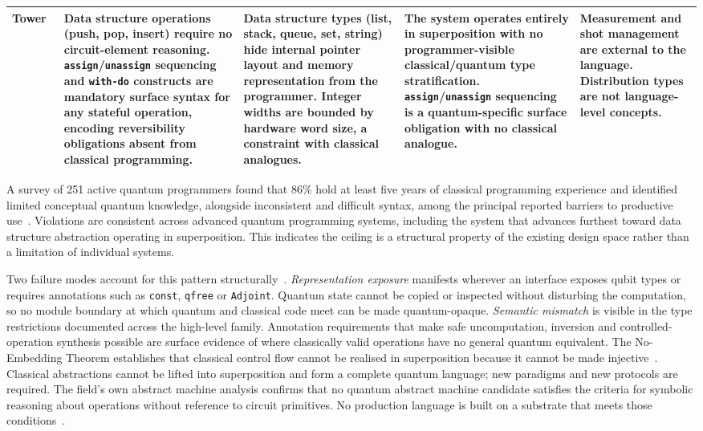 \begin{longtable}{p{1.8cm} p{3.3cm} p{3.3cm} p{3.3cm} p{3.3cm}}
    \textbf{Tower}~\cite{yuan2025foundationalabstractions}
    & Data structure operations (push, pop, insert) require no circuit-element reasoning. \texttt{assign}/\texttt{unassign} sequencing and \texttt{with-do} constructs are mandatory surface syntax for any stateful operation, encoding reversibility obligations absent from classical programming.
    & Data structure types (list, stack, queue, set, string) hide internal pointer layout and memory representation from the programmer. Integer widths are bounded by hardware word size, a constraint with classical analogues.
    & The system operates entirely in superposition with no programmer-visible classical/quantum type stratification. \texttt{assign}/\texttt{unassign} sequencing is a quantum-specific surface obligation with no classical analogue.
    & Measurement and shot management are external to the language. Distribution types are not language-level concepts. \\
    \bottomrule
\end{longtable}
\vspace{2em}

A survey of 251 active quantum programmers found that 86\% hold at least five years of classical programming experience and identified limited conceptual quantum knowledge, alongside inconsistent and difficult syntax, among the principal reported barriers to productive use~\cite{ferreira2024qplusage}.
Violations are consistent across advanced quantum programming systems, including the system that advances furthest toward data structure abstraction operating in superposition.
This indicates the ceiling is a structural property of the existing design space rather than a limitation of individual systems.

Two failure modes account for this pattern structurally~\cite{yuan2025foundationalabstractions}.
\textit{Representation exposure} manifests wherever an interface exposes qubit types or requires annotations such as \texttt{const}, \texttt{qfree} or \texttt{Adjoint}.
Quantum state cannot be copied or inspected without disturbing the computation, so no module boundary at which quantum and classical code meet can be made quantum-opaque.
\textit{Semantic mismatch} is visible in the type restrictions documented across the high-level family.
Annotation requirements that make safe uncomputation, inversion and controlled-operation synthesis possible are surface evidence of where classically valid operations have no general quantum equivalent.
The No-Embedding Theorem establishes that classical control flow cannot be realised in superposition because it cannot be made injective~\cite{yuan2025foundationalabstractions}.
Classical abstractions cannot be lifted into superposition and form a complete quantum language; new paradigms and new protocols are required.
The field's own abstract machine analysis confirms that no quantum abstract machine candidate satisfies the criteria for symbolic reasoning about operations without reference to circuit primitives.
No production language is built on a substrate that meets those conditions~\cite{nunez_corrales2025betterabstractmachines}.

